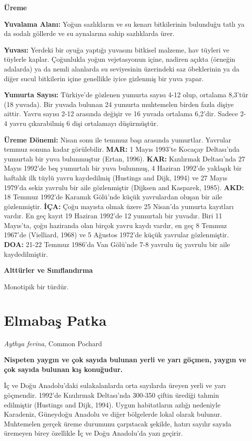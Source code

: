 \documentclass[
  a4paper,
  DIV=11,
  numbers=noendperiod]{scrartcl}
\begin{document}
\textbf{Üreme}

\textbf{Yuvalama Alanı:} Yoğun sazlıkların ve su kenarı bitkilerinin
bulunduğu tatlı ya da sodalı göllerde ve su aynalarına sahip sazlıklarda
ürer.

\textbf{Yuvası:} Yerdeki bir oyuğa yaptığı yuvasını bitkisel malzeme,
hav tüyleri ve tüylerle kaplar. Çoğunlukla yoğun vejetasyonun içine,
nadiren açıkta (örneğin adalarda) ya da nemli alanlarda su seviyesinin
üzerindeki saz öbeklerinin ya da diğer sucul bitkilerin içine genellikle
iyice gizlenmiş bir yuva yapar.

\textbf{Yumurta Sayısı:} Türkiye'de gözlenen yumurta sayısı 4-12 olup,
ortalama 8,3'tür (18 yuvada). Bir yuvada bulunan 24 yumurta muhtemelen
birden fazla dişiye aittir. Yavru sayısı 2-12 arasında değişir ve 16
yuvada ortalama 6,2'dir. Sadece 2-4 yavru çıkarabilmiş 6 dişi ortalamayı
düşürmüştür.

\textbf{Üreme Dönemi:} Nisan sonu ile temmuz başı arasında yumurtlar.
Yavrular temmuz sonuna kadar görülebilir. \textbf{MAR:} 1 Mayıs 1993'te
Kocaçay Deltası'nda yumurtalı bir yuva bulunmuştur (Ertan, 1996).
\textbf{KAR:} Kızılırmak Deltası'nda 27 Mayıs 1992'de beş yumurtalı bir
yuva bulunmuş, 4 Haziran 1992'de yaklaşık bir haftalık ilk tüylü yavru
kaydedilmiş (Hustings and Dijk, 1994) ve 27 Mayıs 1979'da sekiz yavrulu
bir aile gözlenmiştir (Dijksen and Kasparek, 1985). \textbf{AKD:} 18
Temmuz 1992'de Karamık Gölü'nde küçük yavrulardan oluşan bir aile
gözlenmiştir. \textbf{İÇA:} Çoğu mayısta olmak üzere 25 Nisan'da yumurta
kayıtları vardır. En geç kayıt 19 Haziran 1992'de 12 yumurtalı bir
yuvadır. Biri 11 Mayıs'ta, çoğu haziranda olan birçok yavru kaydı
vardır, en geç 8 Temmuz 1967'de (Vielliard, 1968) ve 5 Ağustos 1972'de
küçük yavrular gözlenmiştir. \textbf{DOA:} 21-22 Temmuz 1986'da Van
Gölü'nde 7-8 yavrulu üç yavrulu bir aile kaydedilmiştir.

\textbf{Alttürler ve Sınıflandırma}

Monotipik bir türdür.

\section{Elmabaş Patka}\label{elmabaux15f-patka}

\emph{Aythya ferina}, Common Pochard

\textbf{Nispeten yaygın ve çok sayıda bulunan yerli ve yarı göçmen,
yaygın ve çok sayıda bulunan kış konuğudur.}

İç ve Doğu Anadolu'daki sulakalanlarda orta sayılarda üreyen yerli ve
yarı göçmendir. 1992'de Kızılırmak Deltası'nda 300-350 çiftin ürediği
tahmin edilmiştir (Hustings and Dijk, 1994). Uygun habitatların azlığı
nedeniyle Karadeniz, Güneydoğu Anadolu ve diğer bölgelerde lokal olarak
bulunur. Muhtemelen gerçek üreme durumunu çarpıtacak şekilde, hatırı
sayılır sayıda üremeyen birey özellikle İç ve Doğu Anadolu'da yazı
geçirir.
\end{document}
